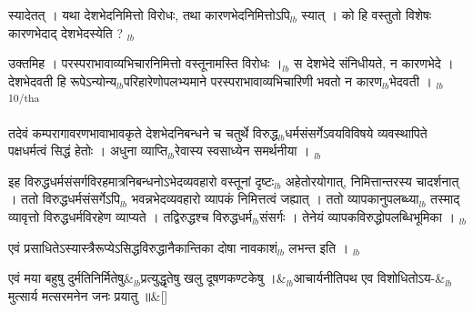 \documentclass[article,12pt,a4paper]{memoir}%
\newcounter{parCount}
\begin{document}
	  
	  \pstart \leavevmode%
	स्यादेतत् । यथा देशभेदनिमित्तो विरोधः, तथा कारणभेदनिमित्तोऽपि{\tiny $_{lb}$} स्यात् । को हि वस्तुतो विशेषः कारणभेदाद् देशभेदस्येति ?
	{}
	\pend%
      {\tiny $_{lb}$}

	  
	  \pstart \leavevmode%
	उक्तमिह । परस्पराभावाव्यभिचारनिमित्तो वस्तूनामस्ति विरोधः ।{\tiny $_{lb}$} स देशभेदे संनिधीयते, न कारणभेदे । देशभेदवती हि रूपेऽन्योन्य{\tiny $_{lb}$}परिहारेणोपलभ्यमाने परस्पराभावाव्यभिचारिणी भवतो न कारण{\tiny $_{lb}$}भेदवती ।
	{}
	\pend%
      {\tiny $_{lb}$}\textsuperscript{\textenglish{10/tha}}

	  
	  \pstart \leavevmode%
	तदेवं कम्परागावरणभावाभावकृते देशभेदनिबन्धने च चतुर्थे विरुद्ध{\tiny $_{lb}$}धर्मसंसर्गेऽवयविविषये व्यवस्थापिते पक्षधर्मत्वं सिद्धं हेतोः । अधुना व्याप्ति{\tiny $_{lb}$}रेवास्य स्वसाध्येन समर्थनीया ।
	{}
	\pend%
      {\tiny $_{lb}$}

	  
	  \pstart \leavevmode%
	इह विरुद्धधर्मसंसर्गविरहमात्रनिबन्धनोऽभेदव्यवहारो वस्तूनां दृष्टः{\tiny $_{lb}$} अहेतोरयोगात्, निमित्तान्तरस्य चादर्शनात् । ततो विरुद्धधर्मसंसर्गेऽपि{\tiny $_{lb}$} भवन्नभेदव्यवहारो व्यापकं निमित्तत्वं जह्यात् । ततो व्यापकानुपलब्ध्या{\tiny $_{lb}$} तस्माद् व्यावृत्तो विरुद्धधर्मविरहेण व्याप्यते । तद्विरुद्धश्च विरुद्धधर्म{\tiny $_{lb}$}संसर्गः । तेनेयं व्यापकविरुद्धोपलब्धिभूमिका ।
	{}
	\pend%
      {\tiny $_{lb}$}

	  
	  \pstart \leavevmode%
	एवं प्रसाधितेऽस्यास्त्रैरूप्येऽसिद्धविरुद्धानैकान्तिका दोषा नावकाशं{\tiny $_{lb}$} लभन्त इति ।
	{}
	\pend%
      {\tiny $_{lb}$}
	    
	    \stanza[\smallbreak]
	  एवं मया बहुषु दुर्मतिनिर्मितेषु&{\tiny $_{lb}$}प्रत्युद्धृतेषु खलु दूषणकण्टकेषु ।&{\tiny $_{lb}$}आचार्यनीतिपथ एव विशोधितोऽय-&{\tiny $_{lb}$}मुत्सार्य मत्सरमनेन जनः प्रयातु ॥\&[\smallbreak]
	  
\end{document}
